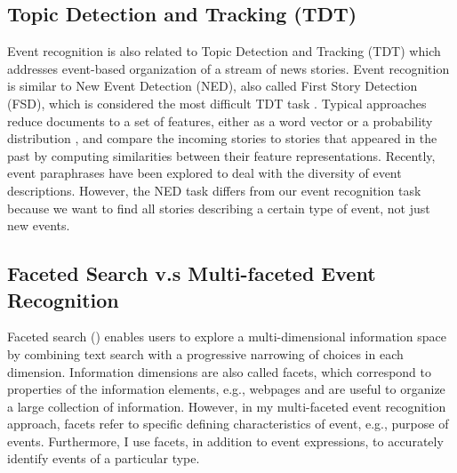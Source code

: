 \subsection{Topic Detection and Tracking (TDT)}

Event recognition is also related to Topic Detection and Tracking
(TDT) \cite{Allan98,TDT02} which addresses event-based organization of a
stream of news stories.  
Event recognition is similar to New Event Detection (NED), also
called First Story Detection (FSD), which is considered the most
difficult TDT task \cite{Allan2000b}.
Typical approaches reduce documents to a set of
features, either as a word vector \cite{Allan2000a} or a probability
distribution \cite{Jin99}, and compare the incoming stories to stories
that appeared in the past by computing similarities between their
feature representations.  
Recently, event paraphrases \cite{Petrovi12} have been explored to deal with
the diversity of event descriptions.
However, the NED task differs from our event
recognition task 
because we want to find all stories describing a certain type of event, not
just new events. 

\subsection{Faceted Search v.s Multi-faceted Event Recognition}
Faceted search (\cite{Hearst06,Tunkelang2009}) enables users 
to explore a multi-dimensional information space 
by combining text search with 
a progressive narrowing 
of choices in each dimension.
Information dimensions are also called facets, which  
correspond to properties of the information elements, e.g., webpages 
and are useful to organize a large collection of information.
However, in my multi-faceted event recognition approach, 
facets refer to specific defining characteristics of event, 
e.g., purpose of events. 
Furthermore, I use facets, in addition to event expressions, 
to accurately identify 
events of a particular type.

